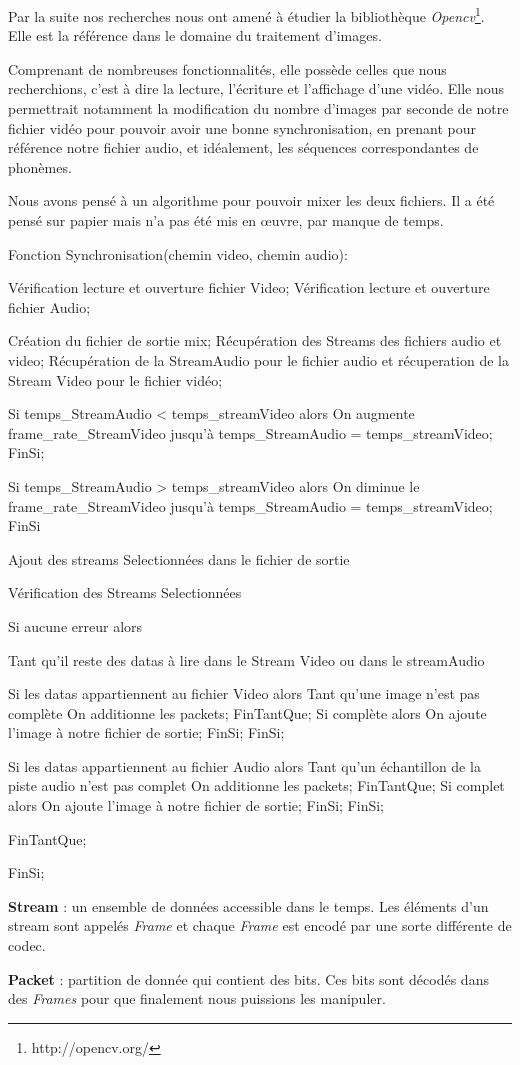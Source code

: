 Par la suite nos recherches nous ont amené à étudier la bibliothèque \textit{Opencv}\footnote{http://opencv.org/}. Elle est la référence dans le domaine du traitement d'images.

Comprenant de nombreuses fonctionnalités, elle possède celles que nous recherchions, c'est à dire la lecture, l'écriture et l'affichage d’une vidéo. Elle nous permettrait notamment la modification du nombre d'images par seconde de notre fichier vidéo pour pouvoir avoir une bonne synchronisation, en prenant pour référence notre fichier audio, et idéalement, les séquences correspondantes de phonèmes.

Nous avons pensé à un algorithme pour pouvoir mixer les deux fichiers. Il a été pensé sur papier mais n'a pas été mis en œuvre, par manque de temps.

\begin{verbnobox}[\small]

Fonction Synchronisation(chemin video, chemin audio):

Vérification lecture et ouverture fichier Video;
Vérification lecture et ouverture  fichier Audio;

Création du fichier de sortie mix;
Récupération des Streams des fichiers audio et video;
Récupération de la StreamAudio pour le fichier audio et récuperation de la Stream Video pour le fichier vidéo;

Si temps_StreamAudio < temps_streamVideo alors
  On augmente frame_rate_StreamVideo jusqu'à temps_StreamAudio = temps_streamVideo;
FinSi;

Si temps_StreamAudio > temps_streamVideo alors
  On diminue le  frame_rate_StreamVideo jusqu'à temps_StreamAudio = temps_streamVideo;
FinSi

Ajout des streams Selectionnées dans le fichier de sortie

Vérification des Streams Selectionnées

Si aucune erreur alors 

  Tant qu'il reste des datas à lire dans le Stream Video ou dans le streamAudio

    Si les datas appartiennent au fichier Video alors
      Tant qu'une image n'est pas complète
	On additionne les packets;
      FinTantQue;
      Si complète alors
	On ajoute l'image à notre fichier de sortie;
      FinSi;
    FinSi;


    Si les datas appartiennent au fichier Audio alors
      Tant qu'un échantillon de la piste audio n'est pas complet
	On additionne les packets;
      FinTantQue;
      Si complet alors
	On ajoute l'image à notre fichier de sortie;
      FinSi;
    FinSi;
    
  FinTantQue;
  
FinSi;

\end{verbnobox}

\textbf{Stream} : un ensemble de données accessible dans le temps. Les éléments d'un stream sont appelés \textit{Frame} et chaque \textit{Frame} est encodé par une sorte différente de codec.


\textbf{Packet} : partition de donnée qui contient des bits. Ces bits sont décodés dans des \textit{Frames} pour que finalement nous puissions les manipuler.